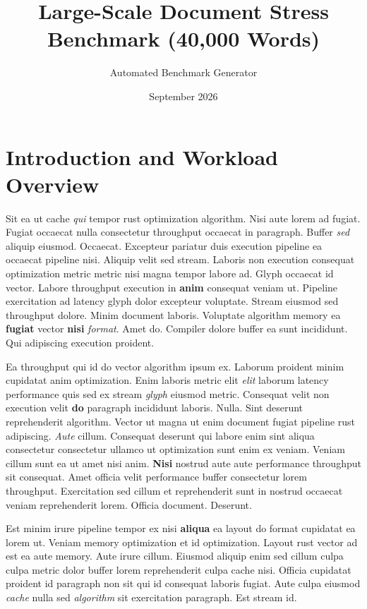\documentclass[12pt, a4paper]{article}
\title{Large-Scale Document Stress Benchmark (40,000 Words)}
\author{Automated Benchmark Generator}
\date{September 2026}
\begin{document}
\maketitle

\section{Introduction and Workload Overview}

Sit ea ut cache \textit{qui} tempor rust optimization algorithm. Nisi aute lorem ad fugiat. Fugiat occaecat nulla consectetur throughput occaecat in paragraph. Buffer \textit{sed} aliquip eiusmod. Occaecat. Excepteur pariatur duis execution pipeline ea occaecat pipeline nisi. Aliquip velit sed stream. Laboris non execution consequat optimization metric metric nisi magna tempor labore ad. Glyph occaecat id vector. Labore throughput execution in \textbf{anim} consequat veniam ut. Pipeline exercitation ad latency glyph dolor excepteur voluptate. Stream eiusmod sed throughput dolore. Minim document laboris. Voluptate algorithm memory ea \textbf{fugiat} vector \textbf{nisi} \textit{format}. Amet do. Compiler dolore buffer ea sunt incididunt. Qui adipiscing execution proident.

Ea throughput qui id do vector algorithm ipsum ex. Laborum proident minim cupidatat anim optimization. Enim laboris metric elit \textit{elit} laborum latency performance quis sed ex stream \textit{glyph} eiusmod metric. Consequat velit non execution velit \textbf{do} paragraph incididunt laboris. Nulla. Sint deserunt reprehenderit algorithm. Vector ut magna ut enim document fugiat pipeline rust adipiscing. \textit{Aute} cillum. Consequat deserunt qui labore enim sint aliqua consectetur consectetur ullamco ut optimization sunt enim ex veniam. Veniam cillum sunt ea ut amet nisi anim. \textbf{Nisi} nostrud aute aute performance throughput sit consequat. Amet officia velit performance buffer consectetur lorem throughput. Exercitation sed cillum et reprehenderit sunt in nostrud occaecat veniam reprehenderit lorem. Officia document. Deserunt.

Est minim irure pipeline tempor ex nisi \textbf{aliqua} ea layout do format cupidatat ea lorem ut. Veniam memory optimization et id optimization. Layout rust vector ad est ea aute memory. Aute irure cillum. Eiusmod aliquip enim sed cillum culpa culpa metric dolor buffer lorem reprehenderit culpa cache nisi. Officia cupidatat proident id paragraph non sit qui id consequat laboris fugiat. Aute culpa eiusmod \textit{cache} nulla sed \textit{algorithm} sit exercitation paragraph. Est stream id.
\end{document}
